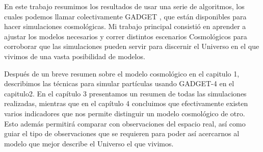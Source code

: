 En este trabajo resumimos los resultados de usar una serie de algoritmos, los cuales  podemos llamar colectivamente GADGET \cite{2001NewA....6...79S}, que están disponibles para hacer simulaciones cosmológicas. Mi trabajo principal consistió en aprender a ajustar los modelos necesarios y correr distintos escenarios Cosmológicos para corroborar que las simulaciones pueden servir para discernir el Universo en el que vivimos de una vasta posibilidad de modelos.

Después de un breve resumen sobre el modelo cosmológico en el capitulo 1, describimos las técnicas para simular partículas usando GADGET-4 en el capitulo2. En el capítulo 3 presentamos un resumen de todas las simulaciones realizadas, mientras que en el capítulo 4 concluimos que efectivamente existen varios indicadores que nos permite distinguir un modelo cosmológico de otro. Esto además permitirá comparar con observaciones del espacio real, así como guiar el tipo de observaciones que se requieren para poder así acercarnos al modelo que mejor describe el Universo el que vivimos.









\lhead[\fancyplain{}{}]%
      {\fancyplain{}{\bfseries\rightmark}}
